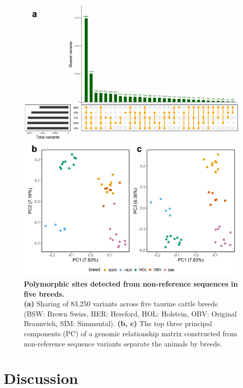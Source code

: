 \documentclass[../main.tex]{subfiles}
\begin{document}
\begin{figure}[!htb]
    \centering
    \includegraphics[width=\textwidth]{paper3/main_figure/Fig5.pdf}
        \caption[Variants detected from non-reference sequences]{\textbf{Polymorphic sites detected from non-reference sequences in five breeds.} \\
        \footnotesize{\textbf{(a)} Sharing of 83,250 variants across five taurine cattle breeds (BSW: Brown Swiss, HER: Hereford, HOL: Holstein, OBV: Original Braunvieh, SIM: Simmental). \textbf{(b, c)} The top three principal components (PC) of a genomic relationship matrix constructed from non-reference sequence variants separate the animals by breeds.}}
        \label{fig45:varnrf}
\end{figure}


\section{Discussion}
\end{document}

